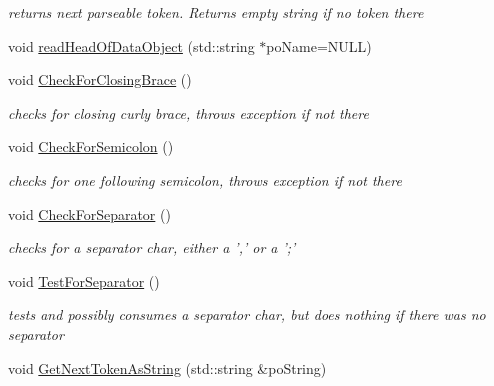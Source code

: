 \begin{DoxyCompactItemize}
\begin{DoxyCompactList}\small\item\em returns next parseable token. Returns empty string if no token there \end{DoxyCompactList}\item 
void \hyperlink{class_assimp_1_1_x_file_parser_ae901575a3f000f9796a414662f445096}{read\+Head\+Of\+Data\+Object} (std\+::string $\ast$po\+Name=N\+U\+L\+L)
\item 
void \hyperlink{class_assimp_1_1_x_file_parser_a957bc3cc01a9b3b04501fe461fa3087d}{Check\+For\+Closing\+Brace} ()
\begin{DoxyCompactList}\small\item\em checks for closing curly brace, throws exception if not there \end{DoxyCompactList}\item 
void \hyperlink{class_assimp_1_1_x_file_parser_a60316a23efd584cde265a3413bd41037}{Check\+For\+Semicolon} ()
\begin{DoxyCompactList}\small\item\em checks for one following semicolon, throws exception if not there \end{DoxyCompactList}\item 
\hypertarget{class_assimp_1_1_x_file_parser_af950d3482dab28f117978297f9bc0355}{void \hyperlink{class_assimp_1_1_x_file_parser_af950d3482dab28f117978297f9bc0355}{Check\+For\+Separator} ()}\label{class_assimp_1_1_x_file_parser_af950d3482dab28f117978297f9bc0355}

\begin{DoxyCompactList}\small\item\em checks for a separator char, either a ',' or a ';' \end{DoxyCompactList}\item 
\hypertarget{class_assimp_1_1_x_file_parser_a634d9c48723049989c9b2ede757a61a6}{void \hyperlink{class_assimp_1_1_x_file_parser_a634d9c48723049989c9b2ede757a61a6}{Test\+For\+Separator} ()}\label{class_assimp_1_1_x_file_parser_a634d9c48723049989c9b2ede757a61a6}

\begin{DoxyCompactList}\small\item\em tests and possibly consumes a separator char, but does nothing if there was no separator \end{DoxyCompactList}\item 
\hypertarget{class_assimp_1_1_x_file_parser_a78ff0a8969af8e9ecc366fd1d4105f19}{void \hyperlink{class_assimp_1_1_x_file_parser_a78ff0a8969af8e9ecc366fd1d4105f19}{Get\+Next\+Token\+As\+String} (std\+::string \&po\+String)}\label{class_assimp_1_1_x_file_parser_a78ff0a8969af8e9ecc366fd1d4105f19}


\end{DoxyCompactItemize}
